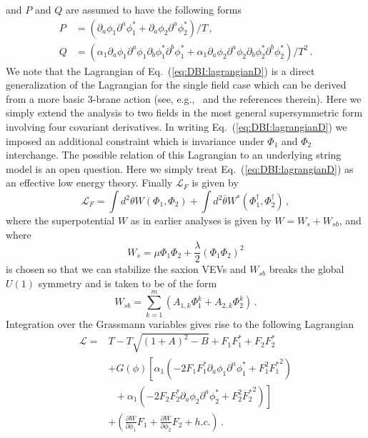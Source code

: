 \documentclass[12pt]{article}
\begin{document}
and $P$ and $Q$ are assumed to have the following forms
\begin{equation} \label{eq:DBI:PQ}
  \begin{aligned}
    P &= \left(
        \partial_a \phi_1 \partial^a \phi^*_1
      + \partial_a \phi_2 \partial^a \phi^*_2
    \right) / T\,,\\
    Q &= \left(
        \alpha_1 \partial_a \phi_1 \partial^a \phi_1 \partial_b \phi^*_1 \partial^b \phi^*_1
      + \alpha_1 \partial_a \phi_2 \partial^a \phi_2 \partial_b \phi^*_2 \partial^b \phi^*_2
    \right) / T^2\,.
  \end{aligned}
\end{equation}
We note that the Lagrangian of Eq.~(\ref{eq:DBI:lagrangianD}) is a direct generalization of the Lagrangian for the single field case which can be derived from a more basic 3-brane action (see, e.g.,~\cite{Rocek:1997hi, Tseytlin:1999dj, Sasaki:2012ka} and the references therein).
Here we simply extend the analysis to two fields in the most general supersymmetric form involving four covariant derivatives.
In writing Eq.~(\ref{eq:DBI:lagrangianD}) we imposed an additional constraint which is invariance under $\Phi_1$ and $\Phi_2$ interchange.
The possible relation of this Lagrangian to an underlying string model is an open question.
Here we simply treat Eq.~(\ref{eq:DBI:lagrangianD}) as an effective low energy theory.
Finally $\mathcal{L}_F$ is given by
\begin{equation}
  \mathcal{L}_F = \int d^2 \theta W\left(\Phi_1, \Phi_2\right)
                + \int d^2 \bar\theta W^*\left(\Phi_1^\dagger, \Phi_2^\dagger\right)\,,
\end{equation}
where the superpotential $W$ as in earlier analyses is given by $W = W_s + W_{sb}$, and where
\begin{equation}
W_s = \mu \Phi_1 \Phi_2 + \frac{\lambda}{2} \left(\Phi_1 \Phi_2\right)^2
\end{equation}
is chosen so that we can stabilize the saxion VEVs and $W_{sb}$ breaks the global $U\left(1\right)$ symmetry and is taken to be of the form
\begin{equation} \label{eq:dbi:Wsb}
  W_{sb} = \sum_{k = 1}^m \left(A_{1, k} \Phi_1^k + A_{2, k} \Phi_2^k\right)\,.
\end{equation}
Integration over the Grassmann variables gives rise to the following Lagrangian
\begin{equation} \label{eq:dbi:lagrangianIntermediate}
  \begin{aligned}
    \mathcal{L} =
      & T - T \sqrt{\left(1 + A\right)^2 - B} + F_1 F^*_1 + F_2 F^*_2\\
      &+ G\left(\phi\right) \left[
        \alpha_1 \left(
          - 2 F_1 F^*_1 \partial_a \phi_1 \partial^a \phi^*_1
          + F_1^2 {F^*_1}^2
        \right)\right.\\
        &~~~ \left.{} + \alpha_1 \left(
          - 2 F_2 F^*_2 \partial_a \phi_2 \partial^a \phi^*_2
          + F_2^2 {F^*_2}^2
        \right)\right]\\
      &+ \left(
          \frac{\partial W}{\partial \phi_1} F_1
        + \frac{\partial W}{\partial \phi_2} F_2
        + h.c.
      \right)\,.
  \end{aligned}
\end{equation}
\end{document}
